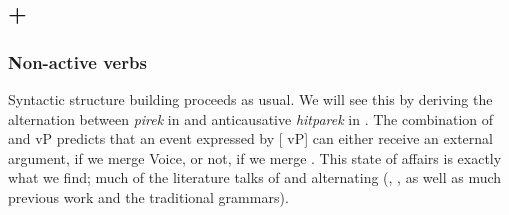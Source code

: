 \begin{exe}
\begin{xlist}
\begin{xlist}
\begin{exe}
\begin{xlist}
\begin{xlist}
\begin{exe}
\begin{xlist}
\begin{xlist}
\begin{exe}
\begin{exe}
\begin{xlist}
\begin{exe}
\begin{exe}
\begin{xlist}
\begin{exe}
\begin{exe}
\begin{exe}
\begin{exe}
\begin{exe}
\begin{xlist}
\begin{exe}
\begin{xlist}
\begin{exe}
\begin{exe}
\begin{xlist}
\begin{exe}
\begin{xlist}
\begin{exe}
\begin{exe}
\begin{exe}
\begin{xlist}
\begin{exe}
\begin{exe}
\begin{exe}
\begin{xlist}
\begin{exe}
\begin{xlist}
\begin{exe}
\begin{xlist}
\begin{exe}
\begin{xlist}
\begin{exe}
\begin{exe}
\begin{exe}
\begin{exe}
\begin{xlist}
\begin{exe}
\begin{xlist}
\begin{exe}
\begin{xlist}
\begin{exe}
\begin{xlist}
\begin{exe}
\begin{xlist}
\begin{exe}
\begin{xlist}
\begin{exe}
\begin{exe}
\begin{exe}
\begin{exe}
\begin{xlist}
\begin{exe}
\begin{xlist}
\begin{exe}
\begin{xlist}
\begin{exe}
\begin{exe}
\begin{xlist}
\begin{exe}
\begin{exe}
\begin{exe}
\begin{exe}
\begin{xlist}
\begin{xlist}
\begin{exe}
\begin{xlist}
\begin{exe}
\begin{exe}
\begin{exe}
\begin{xlist}
\begin{exe}
\begin{exe}
\begin{xlist}
\begin{exe}
\begin{exe}
\begin{exe}
\begin{xlist}
\begin{xlist}
\begin{exe}
\begin{xlist}
\begin{exe}
\begin{exe}
\begin{exe}
	\subsection{{\va} + {\vz}} \label{vz:va:vzva}
		\subsubsection{Non-active verbs} \label{vz:va:vzva:nact}
Syntactic structure building proceeds as usual. We will see this by deriving the alternation between  \emph{pirek} in {\tpie} and anticausative \emph{hitparek} in {\thit}. The combination of {\va} and vP predicts that an event expressed by [{\va} vP] can either receive an external argument, if we merge Voice, or not, if we merge {\vz}. This state of affairs is exactly what we find; much of the literature talks of {\tpie} and {\thit} alternating (\citealt{doron03}, \citealt{arad05}, as well as much previous work and the traditional grammars).


\end{exe}
\end{exe}
\end{exe}
\end{xlist}
\end{exe}
\end{xlist}
\end{xlist}
\end{exe}
\end{exe}
\end{exe}
\end{xlist}
\end{exe}
\end{exe}
\end{xlist}
\end{exe}
\end{exe}
\end{exe}
\end{xlist}
\end{exe}
\end{xlist}
\end{xlist}
\end{exe}
\end{exe}
\end{exe}
\end{exe}
\end{xlist}
\end{exe}
\end{exe}
\end{xlist}
\end{exe}
\end{xlist}
\end{exe}
\end{xlist}
\end{exe}
\end{exe}
\end{exe}
\end{exe}
\end{xlist}
\end{exe}
\end{xlist}
\end{exe}
\end{xlist}
\end{exe}
\end{xlist}
\end{exe}
\end{xlist}
\end{exe}
\end{xlist}
\end{exe}
\end{exe}
\end{exe}
\end{exe}
\end{xlist}
\end{exe}
\end{xlist}
\end{exe}
\end{xlist}
\end{exe}
\end{xlist}
\end{exe}
\end{exe}
\end{exe}
\end{xlist}
\end{exe}
\end{exe}
\end{exe}
\end{xlist}
\end{exe}
\end{xlist}
\end{exe}
\end{exe}
\end{xlist}
\end{exe}
\end{xlist}
\end{exe}
\end{exe}
\end{exe}
\end{exe}
\end{exe}
\end{xlist}
\end{exe}
\end{exe}
\end{xlist}
\end{exe}
\end{exe}
\end{xlist}
\end{xlist}
\end{exe}
\end{xlist}
\end{xlist}
\end{exe}
\end{xlist}
\end{xlist}
\end{exe}
